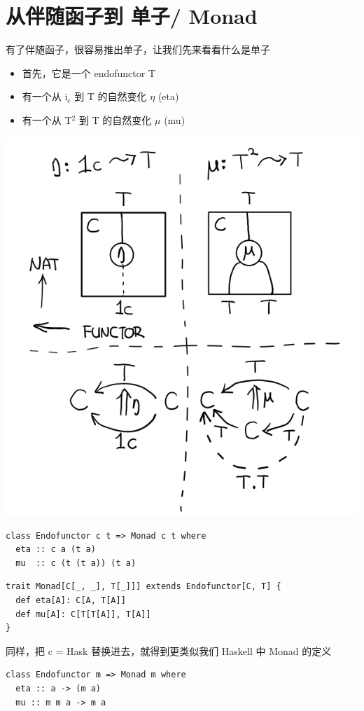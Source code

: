 \documentclass[11pt]{tufte-book}
\begin{document}
\chapter{从伴随函子到 单子/ Monad}
\label{sec:orgac02402}
有了伴随函子，很容易推出单子，让我们先来看看什么是单子

\begin{itemize}
\item 首先，它是一个 endofunctor T
\item 有一个从 i\(_{\text{c}}\) 到 T 的自然变化 \(\eta\) (eta)
\item 有一个从 T\(^{\text{2}}\) 到 T 的自然变化 \(\mu\) (mu)
\end{itemize}

\begin{center}
\includegraphics[width=.9\linewidth]{images/p1-monad-properties.png}
\end{center}

\begin{verbatim}
class Endofunctor c t => Monad c t where
  eta :: c a (t a)
  mu  :: c (t (t a)) (t a)
\end{verbatim}

\begin{verbatim}
trait Monad[C[_, _], T[_]]] extends Endofunctor[C, T] {
  def eta[A]: C[A, T[A]]
  def mu[A]: C[T[T[A]], T[A]]
}
\end{verbatim}
同样，把 c = Hask 替换进去，就得到更类似我们 Haskell 中 Monad 的定义
\begin{verbatim}
class Endofunctor m => Monad m where
  eta :: a -> (m a)
  mu :: m m a -> m a
\end{verbatim}
\end{document}
